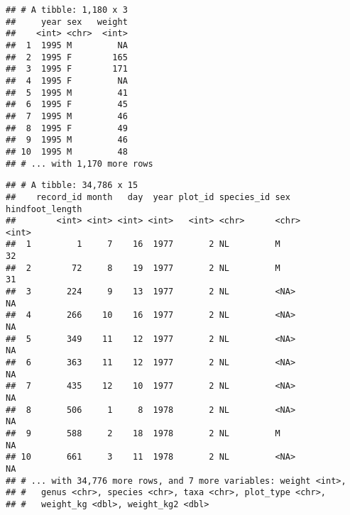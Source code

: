 \documentclass[]{article}
\newenvironment{Shaded}{\begin{snugshade}}{\end{snugshade}}
\newcommand{\KeywordTok}[1]{\textcolor[rgb]{0.13,0.29,0.53}{\textbf{#1}}}
\newcommand{\DataTypeTok}[1]{\textcolor[rgb]{0.13,0.29,0.53}{#1}}
\newcommand{\DecValTok}[1]{\textcolor[rgb]{0.00,0.00,0.81}{#1}}
\newcommand{\StringTok}[1]{\textcolor[rgb]{0.31,0.60,0.02}{#1}}
\newcommand{\OperatorTok}[1]{\textcolor[rgb]{0.81,0.36,0.00}{\textbf{#1}}}
\newcommand{\NormalTok}[1]{#1}
\begin{document}
\begin{verbatim}
## # A tibble: 1,180 x 3
##     year sex   weight
##    <int> <chr>  <int>
##  1  1995 M         NA
##  2  1995 F        165
##  3  1995 F        171
##  4  1995 F         NA
##  5  1995 M         41
##  6  1995 F         45
##  7  1995 M         46
##  8  1995 F         49
##  9  1995 M         46
## 10  1995 M         48
## # ... with 1,170 more rows
\end{verbatim}

\begin{Shaded}
\end{Shaded}

\begin{verbatim}
## # A tibble: 34,786 x 15
##    record_id month   day  year plot_id species_id sex   hindfoot_length
##        <int> <int> <int> <int>   <int> <chr>      <chr>           <int>
##  1         1     7    16  1977       2 NL         M                  32
##  2        72     8    19  1977       2 NL         M                  31
##  3       224     9    13  1977       2 NL         <NA>               NA
##  4       266    10    16  1977       2 NL         <NA>               NA
##  5       349    11    12  1977       2 NL         <NA>               NA
##  6       363    11    12  1977       2 NL         <NA>               NA
##  7       435    12    10  1977       2 NL         <NA>               NA
##  8       506     1     8  1978       2 NL         <NA>               NA
##  9       588     2    18  1978       2 NL         M                  NA
## 10       661     3    11  1978       2 NL         <NA>               NA
## # ... with 34,776 more rows, and 7 more variables: weight <int>,
## #   genus <chr>, species <chr>, taxa <chr>, plot_type <chr>,
## #   weight_kg <dbl>, weight_kg2 <dbl>
\end{verbatim}

\begin{Shaded}
\end{Shaded}
\end{document}
